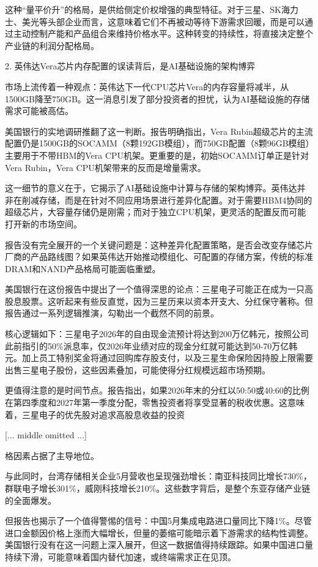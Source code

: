 \documentclass[11pt]{ctexart}
\begin{document}
这种“量平价升”的格局，是供给侧定价权增强的典型特征。对于三星、SK海力士、美光等头部企业而言，这意味着它们不再被动等待下游需求回暖，而是可以通过主动控制产能和产品组合来维持价格水平。这种转变的持续性，将直接决定整个产业链的利润分配格局。

2. 英伟达Vera芯片内存配置的误读背后，是AI基础设施的架构博弈

市场上流传着一种观点：英伟达下一代CPU芯片Vera的内存容量将减半，从1500GB降至750GB。这一消息引发了部分投资者的担忧，认为AI基础设施的存储需求可能被高估。

美国银行的实地调研推翻了这一判断。报告明确指出，Vera Rubin超级芯片的主流配置仍是1500GB的SOCAMM（8颗192GB模组），而750GB配置（8颗96GB模组）主要用于不带HBM的Vera CPU机架。更重要的是，初始SOCAMM订单正是针对Vera Rubin，Vera CPU机架带来的反而是增量需求。

这一细节的意义在于，它揭示了AI基础设施中计算与存储的架构博弈。英伟达并非在削减存储，而是在针对不同应用场景进行差异化配置。对于需要HBM4协同的超级芯片，大容量存储仍是刚需；而对于独立CPU机架，更灵活的配置反而可能打开新的市场空间。

报告没有完全展开的一个关键问题是：这种差异化配置策略，是否会改变存储芯片厂商的产品路线图？如果英伟达开始推动模组化、可配置的存储方案，传统的标准DRAM和NAND产品格局可能面临重塑。

美国银行在这份报告中提出了一个值得深思的论点：三星电子可能正在成为一只高股息股票。这听起来有些反直觉，因为三星历来以资本开支大、分红保守著称。但报告通过一系列逻辑推演，勾勒出一个截然不同的前景。

核心逻辑如下：三星电子2026年的自由现金流预计将达到200万亿韩元，按照公司此前指引的50\%派息率，仅2026年业绩对应的现金分红就可能达到50-70万亿韩元。加上员工特别奖金将通过回购库存股支付，以及三星生命保险因持股上限需要出售三星电子股份，这些因素叠加，可能使得分红规模远超市场预期。

更值得注意的是时间节点。报告指出，如果2026年末的分红以50:50或40:60的比例在第四季度和2027年第一季度分配，零售投资者将享受显著的税收优惠。这意味着，三星电子的优先股对追求高股息收益的投资

[... middle omitted ...]

格因素占据了主导地位。

与此同时，台湾存储相关企业5月营收也呈现强劲增长：南亚科技同比增长730\%，群联电子增长301\%，威刚科技增长210\%。这些数字背后，是整个东亚存储产业链的全面爆发。

但报告也揭示了一个值得警惕的信号：中国5月集成电路进口量同比下降1\%。尽管进口金额因价格上涨而大幅增长，但量的萎缩可能暗示着下游需求的结构性调整。美国银行没有在这一问题上深入展开，但这一数据值得持续跟踪。如果中国进口量持续下滑，可能意味着国内替代加速，或终端需求正在见顶。
\end{document}
